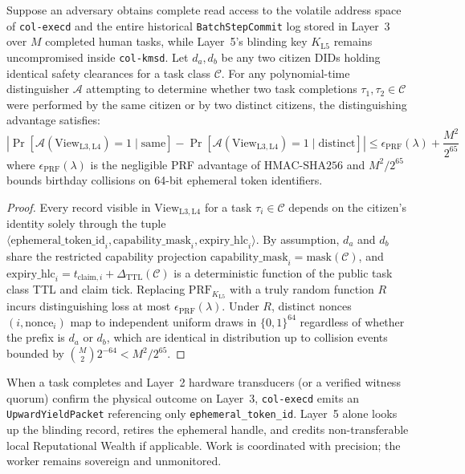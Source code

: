 \begin{theorem}
\label{thm:ch1-claim-unlinkability}
Suppose an adversary obtains complete read access to the volatile address space of
\texttt{col-execd} and the entire historical \texttt{BatchStepCommit} log stored in Layer~3
over $M$ completed human tasks, while Layer~5's blinding key $K_{\mathrm{L5}}$ remains
uncompromised inside \texttt{col-kmsd}. Let $d_a, d_b$ be any two citizen DIDs holding
identical safety clearances for a task class $\mathcal{C}$. For any polynomial-time
distinguisher $\mathcal{A}$ attempting to determine whether two task completions $\tau_1, \tau_2 \in \mathcal{C}$
were performed by the same citizen or by two distinct citizens, the distinguishing advantage
satisfies:
\begin{equation}
\left| \Pr[\mathcal{A}(\mathrm{View}_{\mathrm{L3,L4}}) = 1 \mid \mathrm{same}] - \Pr[\mathcal{A}(\mathrm{View}_{\mathrm{L3,L4}}) = 1 \mid \mathrm{distinct}] \right| \le \epsilon_{\mathrm{PRF}}(\lambda) + \frac{M^2}{2^{65}}
\end{equation}
where $\epsilon_{\mathrm{PRF}}(\lambda)$ is the negligible PRF advantage of
$\mathrm{HMAC\text{-}SHA256}$ and $M^2 / 2^{65}$ bounds birthday collisions on 64-bit
ephemeral token identifiers.
\end{theorem}

\begin{proof}
Every record visible in $\mathrm{View}_{\mathrm{L3,L4}}$ for a task $\tau_i \in \mathcal{C}$
depends on the citizen's identity solely through the tuple $\langle \mathrm{ephemeral\_token\_id}_i, \mathrm{capability\_mask}_i, \mathrm{expiry\_hlc}_i \rangle$.
By assumption, $d_a$ and $d_b$ share the restricted capability projection
$\mathrm{capability\_mask}_i = \mathrm{mask}(\mathcal{C})$, and $\mathrm{expiry\_hlc}_i = t_{\mathrm{claim},i} + \Delta_{\mathrm{TTL}}(\mathcal{C})$
is a deterministic function of the public task class TTL and claim tick. Replacing
$\mathrm{PRF}_{K_{\mathrm{L5}}}$ with a truly random function $R$ incurs distinguishing loss
at most $\epsilon_{\mathrm{PRF}}(\lambda)$. Under $R$, distinct nonces $(i, \mathrm{nonce}_i)$
map to independent uniform draws in $\{0,1\}^{64}$ regardless of whether the prefix is $d_a$
or $d_b$, which are identical in distribution up to collision events bounded by
$\binom{M}{2} 2^{-64} < M^2 / 2^{65}$.
\end{proof}

When a task completes and Layer~2 hardware transducers (or a verified witness quorum)
confirm the physical outcome on Layer~3, \texttt{col-execd} emits an
\texttt{UpwardYieldPacket} referencing only \texttt{ephemeral\_token\_id}. Layer~5 alone
looks up the blinding record, retires the ephemeral handle, and credits non-transferable
local Reputational Wealth if applicable. Work is coordinated with precision; the worker
remains sovereign and unmonitored.

